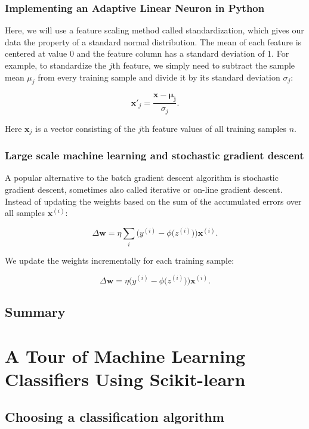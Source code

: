 \documentclass{report}
\begin{document}
\subsection{Implementing an Adaptive Linear Neuron in Python}

Here, we will use a feature scaling method called standardization, which gives our data the property of a standard normal distribution. The mean of each feature
is centered at value 0 and the feature column has a standard deviation of 1. For example, to standardize the $j$th feature, we simply need to subtract the sample mean $\mu_j$ from every training sample and divide it by its standard deviation $\sigma_j$:

\[
\mathbf{x'}_j = \frac{\mathbf{x} - \mathbf{\mathbf{\mu_j}}}{\sigma_j}.
\]


Here $\mathbf{x}_j$ is a vector consisting of the $j$th feature values of all training samples $n$.

\subsection{Large scale machine learning and stochastic gradient descent}

A popular alternative to the batch gradient descent algorithm is stochastic gradient descent, sometimes also called iterative or on-line gradient descent. Instead of updating the weights based on the sum of the accumulated errors over all samples $\mathbf{x}^{(i)}$:

\[
\Delta \mathbf{w} = \eta \sum_i \bigg( y^{(i)} - \phi \big( z^{(i)}\big) \bigg) \mathbf{x}^{(i)}.
\]

We update the weights incrementally for each training sample:

\[
\Delta \mathbf{w} = \eta  \bigg( y^{(i)} - \phi \big( z^{(i)}\big) \bigg) \mathbf{x}^{(i)}.
\]

\section{Summary}



\chapter{A Tour of Machine Learning Classifiers Using Scikit-learn}

\section{Choosing a classification algorithm}
\end{document}
